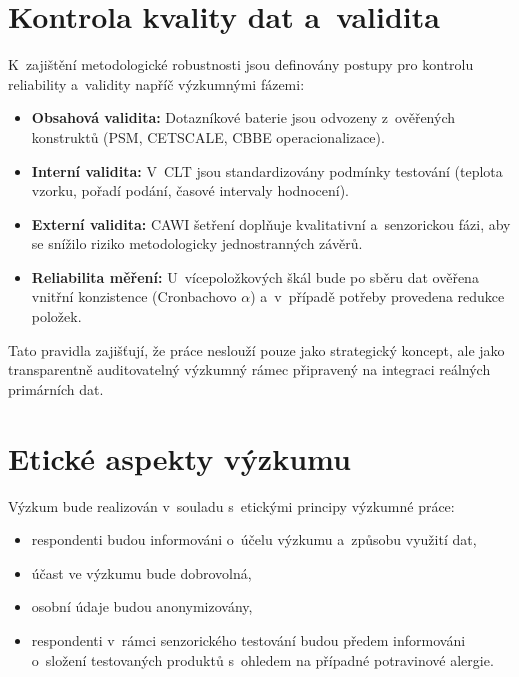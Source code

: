 \section{Kontrola kvality dat a~validita}
\label{sec:meth_validity}

K~zajištění metodologické robustnosti jsou definovány postupy pro kontrolu reliability a~validity napříč výzkumnými fázemi:
\begin{itemize}
  \item \textbf{Obsahová validita:} Dotazníkové baterie jsou odvozeny z~ověřených konstruktů (PSM, CETSCALE, CBBE operacionalizace).
  \item \textbf{Interní validita:} V~CLT jsou standardizovány podmínky testování (teplota vzorku, pořadí podání, časové intervaly hodnocení).
  \item \textbf{Externí validita:} CAWI šetření doplňuje kvalitativní a~senzorickou fázi, aby se snížilo riziko metodologicky jednostranných závěrů.
  \item \textbf{Reliabilita měření:} U~vícepoložkových škál bude po sběru dat ověřena vnitřní konzistence (Cronbachovo $\alpha$) a~v~případě potřeby provedena redukce položek.
\end{itemize}

Tato pravidla zajišťují, že práce neslouží pouze jako strategický koncept, ale jako transparentně auditovatelný výzkumný rámec připravený na integraci reálných primárních dat.

\section{Etické aspekty výzkumu}
\label{sec:meth_ethics}

Výzkum bude realizován v~souladu s~etickými principy výzkumné práce:
\begin{itemize}
  \item respondenti budou informováni o~účelu výzkumu a~způsobu využití dat,
  \item účast ve výzkumu bude dobrovolná,
  \item osobní údaje budou anonymizovány,
  \item respondenti v~rámci senzorického testování budou předem informováni o~složení testovaných produktů s~ohledem na případné potravinové alergie.
\end{itemize}
